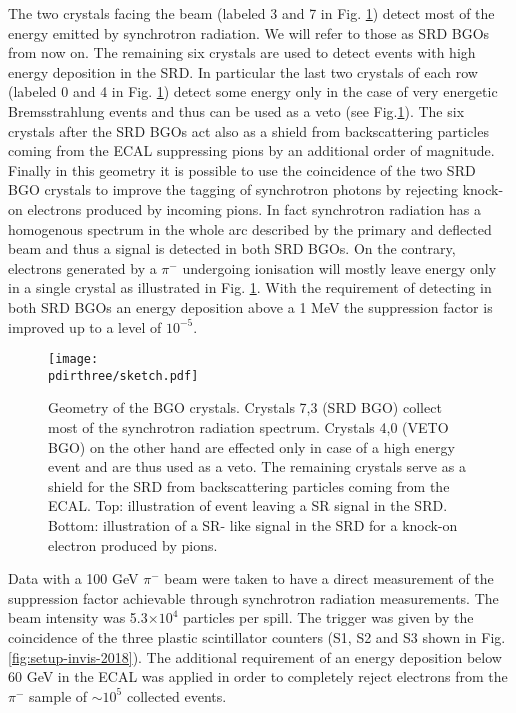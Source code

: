 The two crystals facing the beam (labeled 3 and 7 in Fig. \ref{fig:newgeo}) detect most of the energy emitted by synchrotron radiation. We will refer to those as SRD BGOs from now on. The remaining six crystals are used to detect events with high energy deposition in the SRD. In particular the last two crystals of each row (labeled 0 and 4 in Fig. \ref{fig:newgeo}) detect some energy only in the case of very energetic Bremsstrahlung events and thus can be used as a veto (see Fig.\ref{fig:newgeo}). The six crystals after the SRD BGOs act also as a shield from backscattering particles coming from the ECAL suppressing pions by an additional order of magnitude. Finally in this geometry it is possible to use the coincidence of the two SRD BGO crystals to improve the tagging of synchrotron photons by rejecting knock-on electrons produced by incoming pions. In fact synchrotron radiation has a homogenous spectrum in the whole arc described by the primary and deflected beam and thus a signal is detected in both SRD BGOs. On the contrary, electrons generated by a $\pi^-$ undergoing ionisation will mostly leave energy only in a single crystal as illustrated in Fig. \ref{fig:newgeo}. 
With the requirement of detecting in both SRD BGOs an energy deposition above a 1 MeV the suppression factor is improved up to a level of $10^{-5}$.



\begin{figure}[htb!]
  \centering
  \texttt{[image: \\pdirthree/sketch.pdf]}
  \caption[Geometry of the BGO crystals]{Geometry of the BGO crystals. Crystals 7,3 (SRD BGO) collect most of the synchrotron radiation spectrum. Crystals 4,0 (VETO BGO) on the other hand are effected only in case of a high energy event and are thus used as a veto. The remaining crystals serve as a shield for the SRD from backscattering particles coming from the ECAL. Top: illustration of event leaving a SR signal in the SRD. Bottom: illustration of a SR- like signal in the SRD for a knock-on electron produced by pions.}
\label{fig:newgeo}
\end{figure}

Data with a 100 GeV $\pi^-$ beam were taken to have a direct measurement of the suppression factor achievable through synchrotron radiation measurements. The beam intensity was 5.3$\times 10^4$ particles per spill. The trigger was given by the coincidence of the three plastic scintillator counters (S1, S2 and S3 shown in Fig.\ref{fig:setup-invis-2018}). The additional requirement of an energy deposition below 60 GeV in the ECAL was applied in order to completely reject electrons from the $\pi^-$ sample of $\sim 10^5$ collected events.

